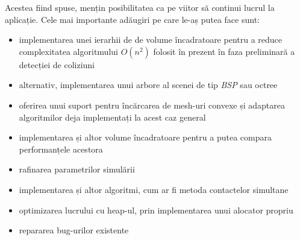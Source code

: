 \documentclass[12pt,a4paper]{report}
\begin{document}
Acestea fiind spuse, mențin posibilitatea ca pe viitor să continui lucrul la aplicație. Cele mai importante adăugiri pe care le-aș putea face sunt:
\begin{itemize}
	\item implementarea unei ierarhii de de volume încadratoare pentru a reduce complexitatea algoritmului $O(n^2)$ folosit în prezent în faza preliminară a detecției de coliziuni
	\item alternativ, implementarea unui arbore al scenei de tip \textit{BSP} sau octree
	\item oferirea unui suport pentru încărcarea de mesh-uri convexe și adaptarea algoritmilor deja implementați la acest caz general
	\item implementarea și altor volume încadratoare pentru a putea compara performanțele acestora
	\item rafinarea parametrilor simulării
	\item implementarea și altor algoritmi, cum ar fi metoda contactelor simultane
	\item optimizarea lucrului cu heap-ul, prin implementarea unui alocator propriu 
	\item repararea bug-urilor existente
\end{itemize}
%
%
%



% 
% 
\end{document}
